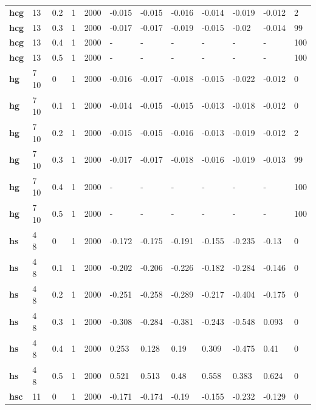 \begin{longtable}[h]{|p{0.8cm}|p{1.5cm}|p{1cm}|p{1cm}|p{1cm}|p{1cm}|p{1cm}|p{1cm}|p{1cm}|p{1cm}|p{1cm}|p{1.5cm}|}
           \\
  \textbf{hcg } &  13         & 0.2 & 1 & 2000 & -0.015 & -0.015 & -0.016 & -0.014 & -0.019 & -0.012 &   2
           \\
  \textbf{hcg } &  13         & 0.3 & 1 & 2000 & -0.017 & -0.017 & -0.019 & -0.015 &  -0.02 & -0.014 &  99
           \\
  \textbf{hcg } &  13         & 0.4 & 1 & 2000 & - & - & - & - & - & - & 100
           \\
  \textbf{hcg } &  13         & 0.5 & 1 & 2000 & - & - & - & - & - & - & 100
           \\
  \textbf{hg  } &  7 10       &   0 & 1 & 2000 & -0.016 & -0.017 & -0.018 & -0.015 & -0.022 & -0.012 &   0
           \\
  \textbf{hg  } &  7 10       & 0.1 & 1 & 2000 & -0.014 & -0.015 & -0.015 & -0.013 & -0.018 & -0.012 &   0
           \\
  \textbf{hg  } &  7 10       & 0.2 & 1 & 2000 & -0.015 & -0.015 & -0.016 & -0.013 & -0.019 & -0.012 &   2
           \\
  \textbf{hg  } &  7 10       & 0.3 & 1 & 2000 & -0.017 & -0.017 & -0.018 & -0.016 & -0.019 & -0.013 &  99
           \\
  \textbf{hg  } &  7 10       & 0.4 & 1 & 2000 & - & - & - & - & - & - & 100
           \\
  \textbf{hg  } &  7 10       & 0.5 & 1 & 2000 & - & - & - & - & - & - & 100
           \\
  \textbf{hs  } &  4 8        &   0 & 1 & 2000 & -0.172 & -0.175 & -0.191 & -0.155 & -0.235 &  -0.13 &   0
           \\
  \textbf{hs  } &  4 8        & 0.1 & 1 & 2000 & -0.202 & -0.206 & -0.226 & -0.182 & -0.284 & -0.146 &   0
           \\
  \textbf{hs  } &  4 8        & 0.2 & 1 & 2000 & -0.251 & -0.258 & -0.289 & -0.217 & -0.404 & -0.175 &   0
           \\
  \textbf{hs  } &  4 8        & 0.3 & 1 & 2000 & -0.308 & -0.284 & -0.381 & -0.243 & -0.548 &  0.093 &   0
           \\
  \textbf{hs  } &  4 8        & 0.4 & 1 & 2000 &  0.253 &  0.128 &   0.19 &  0.309 & -0.475 &   0.41 &   0
           \\
  \textbf{hs  } &  4 8        & 0.5 & 1 & 2000 &  0.521 &  0.513 &   0.48 &  0.558 &  0.383 &  0.624 &   0
           \\
  \textbf{hsc } &  11         &   0 & 1 & 2000 & -0.171 & -0.174 &  -0.19 & -0.155 & -0.232 & -0.129 &   0

\end{longtable}
